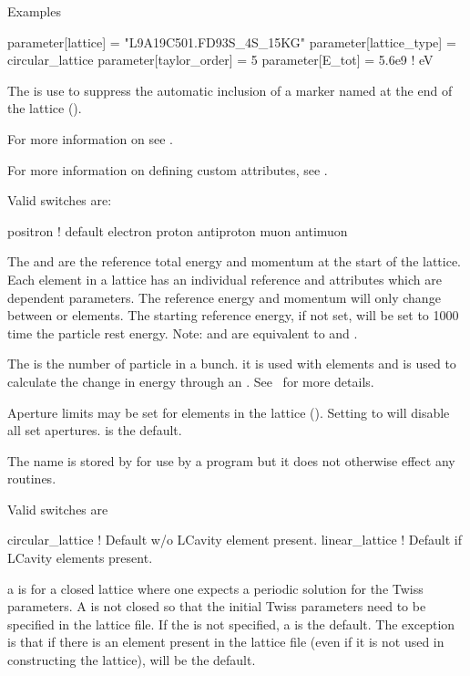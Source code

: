 \noindent
Examples
\begin{example}
  parameter[lattice]      = "L9A19C501.FD93S_4S_15KG"
  parameter[lattice_type] = circular_lattice
  parameter[taylor_order] = 5
  parameter[E_tot]        = 5.6e9    ! eV
\end{example}

The  is use to suppress the automatic inclusion
of a marker named  at the end of the lattice (). 

For more information on  see .

For more information on defining custom attributes, see .

Valid  switches are:
\begin{example}
  positron  ! default
  electron
  proton
  antiproton
  muon
  antimuon
\end{example}

The  and  are the reference
total energy and momentum at the start of the lattice. Each element
in a lattice has an individual reference  and  attributes
which are dependent parameters. The reference energy and momentum will only
change between  or  elements. The starting
reference energy, if not set, will be set to 1000 time the particle
rest energy.  Note:  and  are
equivalent to  and .

The  is the number of particle in a bunch.
it is used with  elements and is used to calculate the
change in energy through an . See~ for more
details.

Aperture limits may be set for elements in the lattice
(). Setting  to  will
disable all set apertures.  is the default.

The  name is stored by \bmad for use by a program but it does
not otherwise effect any \bmad routines. 

\noindent
{}
Valid  switches are
\begin{example}
  circular_lattice  ! Default w/o LCavity element present.
  linear_lattice    ! Default if LCavity elements present.
\end{example}
a  is for a closed lattice where one expects a
periodic solution for the Twiss parameters. A  is
not closed so that the initial Twiss parameters need to be specified
in the lattice file. If the  is not specified, a
 is the default. The exception is that if there
is an  element present in the lattice file (even if it is
not used in constructing the lattice),  will be the
default.

